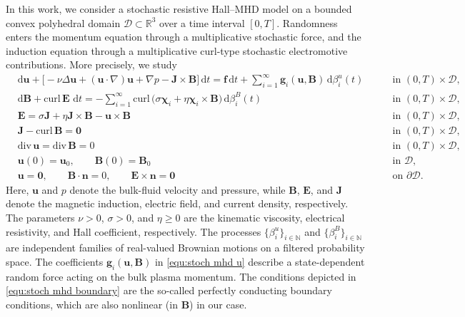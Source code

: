 \documentclass[11pt, reqno]{amsart}
\theoremstyle{definition}
\numberwithin{equation}{section}
\newcommand{\curl}{\mathrm{curl}\,}
\newcommand{\divg}{\mathrm{div}\,}
\newcommand{\bff}{\boldsymbol}
\newcommand{\bb}{\mathbb}
\newcommand{\du}{\mathrm{d}\bff{u}}
\newcommand{\dB}{\mathrm{d}\bff{B}}
\newcommand{\dt}{\,\mathrm{d}t}
\newcommand{\dbeta}{\mathrm{d}\beta}
\begin{document}
In this work, we consider a stochastic resistive Hall--MHD model on a bounded convex polyhedral domain $\mathscr{D}\subset\mathbb{R}^3$ over a time interval $[0,T]$. Randomness enters the momentum equation through a multiplicative stochastic force, and the induction equation through a multiplicative curl-type stochastic electromotive contributions. More precisely, we study
\begin{subequations}\label{equ:stoch mhd}
	\begin{alignat}{2}
		&\du+\big[-\nu\Delta\bff{u}+(\bff{u}\cdot\nabla)\bff{u}+\nabla p-\bff{J}\times\bff{B}\big]\dt
		=
		\bff{f}\dt+\sum_{i=1}^{\infty}\bff{g}_i(\bff{u},\bff{B})\,\dbeta_i^u(t)
		\; && \quad\text{in }(0,T)\times\mathscr{D},
		\label{equ:stoch mhd u}
		\\
		&\dB+\curl\bff{E}\,\dt
		=
		-\sum_{i=1}^{\infty}\curl\bigl(\sigma\bff{\chi}_i+\eta\bff{\chi}_i\times\bff{B}\bigr)\,\dbeta_i^B(t)
		\; && \quad\text{in }(0,T)\times\mathscr{D},
		\label{equ:stoch mhd B}
		\\[1ex]
		&\bff{E}= \sigma\bff{J}+\eta\bff{J}\times\bff{B} -\bff{u}\times\bff{B}
		\; && \quad\text{in }(0,T)\times\mathscr{D},
		\label{equ:stoch mhd ohm}
		\\[1ex]
		&\bff{J}-\curl\bff{B}=\bff{0}
		\; && \quad\text{in }(0,T)\times\mathscr{D},
		\label{equ:stoch mhd ampere}
		\\[1ex]
		&\divg\bff{u}=\divg\bff{B}=0
		\; && \quad\text{in }(0,T)\times\mathscr{D},
		\label{equ:stoch mhd div}
		\\[1ex]
		&\bff{u}(0)=\bff{u}_0,\qquad \bff{B}(0)=\bff{B}_0
		\; && \quad\text{in }\mathscr{D},
		\label{equ:stoch mhd init}
		\\[1ex]
		&\bff{u}=\bff{0},\qquad \bff{B}\cdot\bff{n}=0,\qquad \bff{E}\times\bff{n}=\bff{0}
		\; && \quad\text{on }\partial\mathscr{D}.
		\label{equ:stoch mhd boundary}
	\end{alignat}
\end{subequations}
Here, $\bff{u}$ and $p$ denote the bulk-fluid velocity and pressure, while $\bff{B}$, $\bff{E}$, and $\bff{J}$ denote the magnetic induction, electric field, and current density, respectively. The parameters $\nu>0$, $\sigma>0$, and $\eta\geq0$ are the kinematic viscosity, electrical resistivity, and Hall coefficient, respectively. The processes $\{\beta_i^u\}_{i\in \bb{N}}$ and $\{\beta_i^B\}_{i\in \bb{N}}$ are independent families of real-valued Brownian motions on a filtered probability space. The coefficients $\bff{g}_i(\bff{u},\bff{B})$ in \eqref{equ:stoch mhd u} describe a state-dependent random force acting on the bulk plasma momentum. The conditions depicted in \eqref{equ:stoch mhd boundary} are the so-called perfectly conducting boundary conditions, which are also nonlinear (in $\bff{B}$) in our case.
\end{document}
